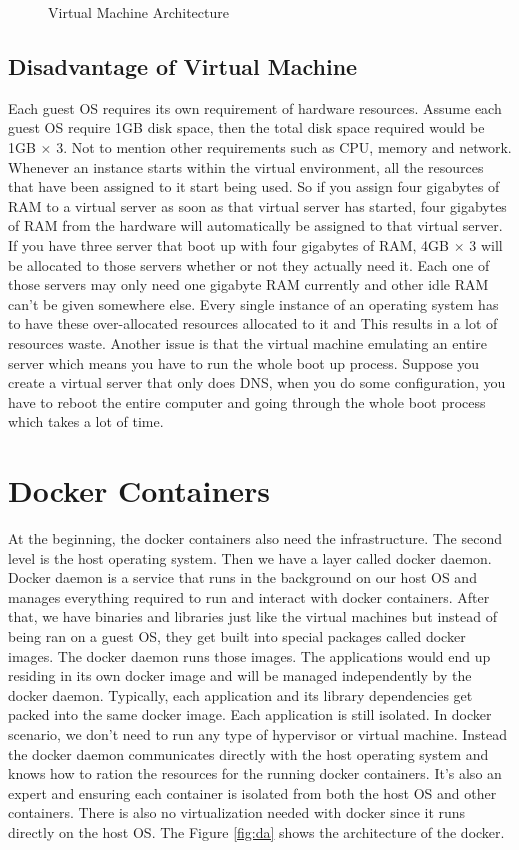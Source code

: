\documentclass{sig-alternate}
\begin{document}
\begin{figure}[ht]
\centering
{}
\caption{Virtual Machine Architecture}
\label{fig:vma}
\vskip -6pt
\end{figure}

\subsection{Disadvantage of Virtual Machine}
Each guest OS requires its own requirement of hardware resources. Assume each guest OS require 1GB disk space, then the total disk space required would be 1GB $\times$ 3. Not to mention other requirements such as CPU, memory and network. Whenever an instance starts within the virtual environment, all the resources that have been assigned to it start being used. So if you assign four gigabytes of RAM to a virtual server as soon as that virtual server has started, four gigabytes of RAM from the hardware will automatically be assigned to that virtual server. If you have three server that boot up with four gigabytes of RAM, 4GB $\times$ 3 will be allocated to those servers whether or not they actually need it. Each one of those servers may only need one gigabyte RAM currently and other idle RAM can't be given somewhere else. Every single instance of an operating system has to have these over-allocated resources allocated to it and  This results in a lot of resources waste. Another issue is that the virtual machine emulating an entire server which means you have to run the whole boot up process. Suppose you create a virtual server that only does DNS, when you do some configuration, you have to reboot the entire computer and going through the whole boot process which takes a lot of time. 

\section{Docker Containers}
At the beginning, the docker containers also need the infrastructure. The second level is the host operating system. Then we have a layer called docker daemon. Docker daemon is a service that runs in the background on our host OS and manages everything required to run and interact with docker containers. After that, we have binaries and libraries just like the virtual machines but instead of being ran on a guest OS, they get built into special packages called docker images. The docker daemon runs those images. The applications would end up residing in its own docker image and will be managed independently by the docker daemon. Typically, each application and its library dependencies get packed into the same docker image. Each application is still isolated. In docker scenario, we don't need to run any type of hypervisor or virtual machine. Instead the docker daemon communicates directly with the host operating system and knows how to ration the resources for the running docker containers. It's also an expert and ensuring each container is isolated from both the host OS and other containers. There is also no virtualization needed with docker since it runs directly on the host OS. The Figure \ref{fig:da} shows the architecture of the docker. 
\end{document}
